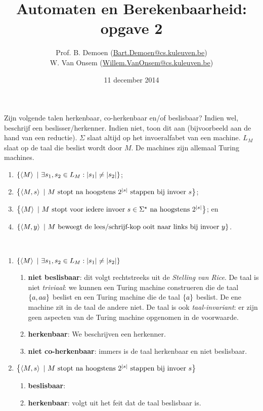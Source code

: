 \documentclass{article}
\title{Automaten en Berekenbaarheid:\\opgave 2}
\author{Prof. B. Demoen (\url{Bart.Demoen@cs.kuleuven.be})\\ W. Van Onsem (\url{Willem.VanOnsem@cs.kuleuven.be})}
\date{11 december 2014}
\begin{document}
\maketitle
\richtlijnen{}

\begin{question}[Berekenbaarheid]
Zijn volgende talen herkenbaar, co-herkenbaar en/of beslisbaar? Indien wel, beschrijf een beslisser/herkenner. Indien niet, toon dit aan (bijvoorbeeld aan de hand van een reductie). $\Sigma$ slaat altijd op het invoeralfabet van een machine. $L_M$ slaat op de taal die beslist wordt door $M$. De machines zijn allemaal Turing machines.
\begin{enumerate}
 \item $\left\{ \left\langle M \right\rangle\ |\ \exists s_1,s_2\in L_M:\left|s_1\right|\neq\left|s_2\right| \right\}$;
 \item $\left\{ \left\langle M,s \right\rangle\ |\ \mbox{$M$ stopt na hoogstens $2^{\left|s\right|}$ stappen bij invoer $s$} \right\}$;
 \item $\left\{ \left\langle M \right\rangle\ |\ \mbox{$M$ stopt voor iedere invoer $s\in\Sigma^{\star}$ na hoogstens $2^{\left|s\right|}$} \right\}$; en
 \item $\left\{ \left\langle M,y \right\rangle\ |\ \mbox{$M$ beweegt de lees/schrijf-kop ooit naar links bij invoer $y$} \right\}$.
\end{enumerate}
\begin{answer}~~
\begin{enumerate}
 \item $\left\{ \left\langle M \right\rangle\ |\ \exists s_1,s_2\in L_M:\left|s_1\right|\neq\left|s_2\right| \right\}$
 \begin{enumerate}
  \item \textbf{niet beslisbaar}: dit volgt rechtstreeks uit de \emph{Stelling van Rice}. De taal is niet \emph{triviaal}: we kunnen een Turing machine construeren die de taal $\left\{ a,aa \right\}$ beslist en een Turing machine die de taal $\left\{ a \right\}$ beslist. De ene machine zit in de taal de andere niet. De taal is ook \emph{taal-invariant}: er zijn geen aspecten van de Turing machine opgenomen in de voorwaarde.
  \item \textbf{herkenbaar}: We beschrijven een herkenner.
  \item \textbf{niet co-herkenbaar}: immers is de taal herkenbaar en niet beslisbaar.
 \end{enumerate}
 \item $\left\{ \left\langle M,s \right\rangle\ |\ \mbox{$M$ stopt na hoogstens $2^{\left|s\right|}$ stappen bij invoer $s$} \right\}$
 \begin{enumerate}
  \item \textbf{beslisbaar}: 
  \item \textbf{herkenbaar}: volgt uit het feit dat de taal beslisbaar is.

\end{enumerate}
\end{enumerate}
\end{answer}
\end{question}
\end{document}
